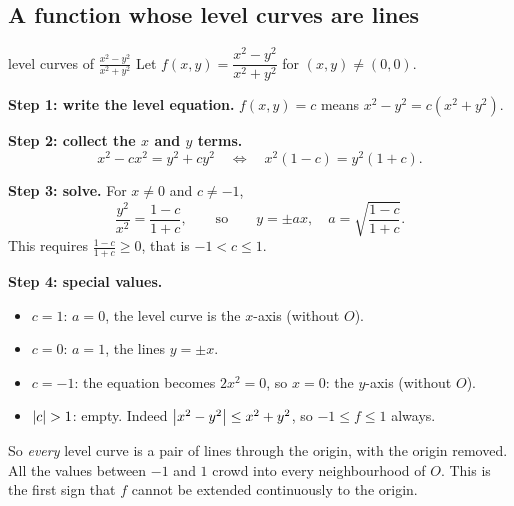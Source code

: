 \subsection{A function whose level curves are lines}

\begin{example}{level curves of $\frac{x^2-y^2}{x^2+y^2}$}
Let $f(x,y)=\dfrac{x^2-y^2}{x^2+y^2}$ for $(x,y)\neq(0,0)$.

\textbf{Step 1: write the level equation.} $f(x,y)=c$ means
$x^2-y^2=c(x^2+y^2)$.

\textbf{Step 2: collect the $x$ and $y$ terms.}
\[ x^2-cx^2 = y^2+cy^2 \quad\Longleftrightarrow\quad x^2(1-c)=y^2(1+c). \]

\textbf{Step 3: solve.} For $x\neq 0$ and $c\neq -1$,
\[ \frac{y^2}{x^2}=\frac{1-c}{1+c}, \qquad\text{so}\qquad
   y=\pm a x,\quad a=\sqrt{\frac{1-c}{1+c}} . \]
This requires $\frac{1-c}{1+c}\ge0$, that is $-1<c\le 1$.

\textbf{Step 4: special values.}
\begin{itemize}
  \item $c=1$: $a=0$, the level curve is the $x$-axis (without $O$).
  \item $c=0$: $a=1$, the lines $y=\pm x$.
  \item $c=-1$: the equation becomes $2x^2=0$, so $x=0$: the $y$-axis (without $O$).
  \item $\left\lvert c\right\rvert>1$: empty. Indeed $\left\lvert x^2-y^2\right\rvert\le x^2+y^2$, so $-1\le f\le 1$ always.
\end{itemize}
So \emph{every} level curve is a pair of lines through the origin, with the origin
removed. All the values between $-1$ and $1$ crowd into every neighbourhood of $O$. This
is the first sign that $f$ cannot be extended continuously to the origin.
\end{example}

